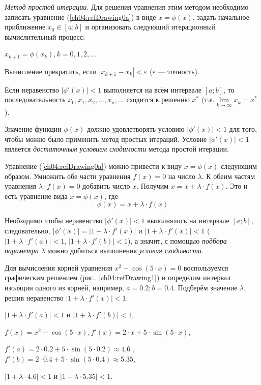 \emph{Метод простой итерации}. Для решения уравнения этим методом необходимо записать уравнение
(\ref{ch04:refDrawing0a}) в виде  $x=\phi(x)$, задать начальное приближение  $x_0\in [a;b]$ и организовать следующий
итерационный вычислительный процесс: 

$x_{k+1}=\phi(x_k),k=0,1,2,...$

Вычисление прекратить, если  $|x_{k+1}-x_k|<\varepsilon$
($\varepsilon$ --- точность).

Если неравенство  $|\phi'(x)|<1$ выполняется на всём интервале  $[a;b]$, то последовательность 
$x_0, x_1, x_2,...,x_n,...$ сходится к решению $x^*$ (т.е.$\lim\limits_{k\rightarrow \infty}x_k=x^*$).


Значение функции  $\phi(x)$  должно удовлетворять условию  $|\phi'(x)|<1$  для того, чтобы можно было применить метод
простых итераций. Условие  $|\phi'(x)|<1$  является
\emph{достаточным условием сходимости} метода простой итерации.

Уравнение (\ref{ch04:refDrawing0a}) можно привести к виду  $x=\phi(x)$ 
следующим образом. Умножить обе части уравнения  $f(x)=0$
на число  $\lambda$. К обеим частям уравнения  $\lambda\cdot f(x)=0$ добавить число $x$. Получим 
$x=x+\lambda\cdot f(x)$. Это и есть уравнение вида  $x=\phi(x)$, где 
\begin{equation}\label{ch04:refDrawing3a}
 \phi(x)=x+\lambda\cdot f(x)
\end{equation}

Необходимо чтобы неравенство  $|\phi'(x)|<1$ выполнялось на интервале  $[a;b]$, следовательно, 
$|\phi'(x)|=|1+\lambda\cdot f'(x)|$  и  $|1+\lambda\cdot f'(x)|<1$  ($|1+\lambda\cdot f'(a)|<1$,  $|1+\lambda\cdot
f'(b)|<1$), а значит, с помощью \emph{подбора параметра}  $\lambda$  можно добиться выполнения
\emph{условия сходимости}. 

Для вычисления корней уравнения  $x^2-\cos (5\cdot x)=0$  воспользуемся графическим 
решением (рис.~\ref{ch04:refDrawing1}) и
определим интервал изоляции одного из корней, например,  $a=0.2;b=0.4$. 
Подберём значение  $\lambda$,  решив
неравенство  $|1+\lambda\cdot f'(x)|<1$:
 
$|1+\lambda\cdot f'(a)|<1$ и  $|1+\lambda\cdot f'(b)|<1$,

$f(x)=x^{2}-\cos (5\cdot x),f'(x)=2\cdot x+5\cdot \sin (5\cdot x)$,

$f'(a)=2\cdot 0.2+5\cdot \sin (5\cdot 0.2)\approx 4.6$ ,  $f'(b)=2\cdot 0.4+5\cdot \sin (5\cdot 0.4)\approx 5.35$,

 $|1+\lambda\cdot 4.6|<1$  и  $|1+\lambda\cdot 5.35|<1$.

